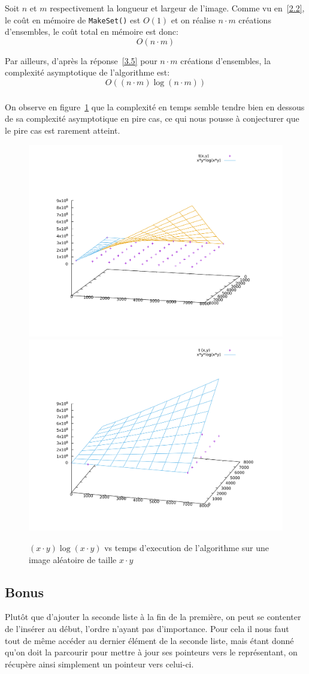\documentclass[10pt,a4paper]{article}
\begin{document}
{\subsubsection{}
Soit $n$ et $m$ respectivement la longueur et largeur de l'image.
Comme vu en~\ref{2.2}, le coût en mémoire de \texttt{MakeSet()} est $O(1)$ et on réalise $n \cdot m$ créations d'ensembles, le coût total en mémoire est donc:
$$O(n\cdot{m})$$

Par ailleurs, d'après la réponse~\ref{3.5} pour $n\cdot{m}$ créations d'ensembles, la complexité asymptotique de l'algorithme est:
$$O((n\cdot{m})\log(n\cdot{m}))$$

\subsubsection{}
On observe en figure~\ref{fig:graph} que la complexité en temps semble tendre bien en dessous de sa complexité asymptotique en pire cas, ce qui nous pousse à conjecturer que le pire cas est rarement atteint.
\begin{figure}[h]
\centering
\includegraphics[width=0.49\linewidth]{graph1.pdf}
\includegraphics[width=0.49\linewidth]{graph2.pdf}
\caption{$(x \cdot y)\log(x \cdot y)$ vs temps d'execution de l'algorithme sur une image aléatoire de taille $x \cdot y$}
\label{fig:graph}
\end{figure}

\subsection{Bonus}
Plut\^ot que d'ajouter la seconde liste à la fin de la première, on peut se contenter de l'insérer au début, l'ordre n'ayant pas d'importance.
Pour cela il nous faut tout de même accéder au dernier élément de la seconde liste, mais étant donné qu'on doit la parcourir pour mettre à jour ses pointeurs vers le représentant, on récupère ainsi simplement un pointeur vers celui-ci.

}
\end{document}
